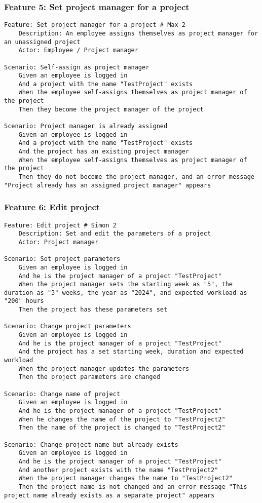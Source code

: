 \subsubsection{Feature 5: Set project manager for a project}%
\begin{lstlisting}
Feature: Set project manager for a project # Max 2
    Description: An employee assigns themselves as project manager for an unassigned project
    Actor: Employee / Project manager

Scenario: Self-assign as project manager
    Given an employee is logged in
    And a project with the name "TestProject" exists
    When the employee self-assigns themselves as project manager of the project
    Then they become the project manager of the project
    
Scenario: Project manager is already assigned
    Given an employee is logged in
    And a project with the name "TestProject" exists
    And the project has an existing project manager
    When the employee self-assigns themselves as project manager of the project
    Then they do not become the project manager, and an error message "Project already has an assigned project manager" appears
\end{lstlisting}

\subsubsection{Feature 6: Edit project}
\begin{lstlisting}
Feature: Edit project # Simon 2
    Description: Set and edit the parameters of a project
    Actor: Project manager

Scenario: Set project parameters
    Given an employee is logged in
    And he is the project manager of a project "TestProject"
    When the project manager sets the starting week as "5", the duration as "3" weeks, the year as "2024", and expected workload as "200" hours
    Then the project has these parameters set

Scenario: Change project parameters
    Given an employee is logged in
    And he is the project manager of a project "TestProject"
    And the project has a set starting week, duration and expected workload
    When the project manager updates the parameters
    Then the project parameters are changed

Scenario: Change name of project
    Given an employee is logged in
    And he is the project manager of a project "TestProject"
    When he changes the name of the project to "TestProject2"
    Then the name of the project is changed to "TestProject2"

Scenario: Change project name but already exists
    Given an employee is logged in
    And he is the project manager of a project "TestProject"
    And another project exists with the name "TestProject2"
    When the project manager changes the name to "TestProject2"
    Then the project name is not changed and an error message "This project name already exists as a separate project" appears
\end{lstlisting}

